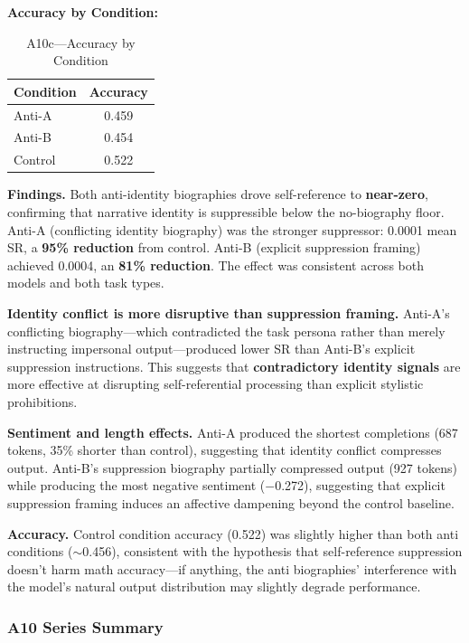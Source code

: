 \documentclass[11pt,a4paper]{article}
\begin{document}
\textbf{Accuracy by Condition:}

\begin{table}[H]
\centering
\caption{A10c---Accuracy by Condition}
\label{tab:a10c_acc}
\begin{tabular}{lc}
\toprule
\textbf{Condition} & \textbf{Accuracy} \\
\midrule
Anti-A & 0.459 \\
Anti-B & 0.454 \\
Control & 0.522 \\
\bottomrule
\end{tabular}
\end{table}

\textbf{Findings.} Both anti-identity biographies drove self-reference to \textbf{near-zero}, confirming that narrative identity is suppressible below the no-biography floor. Anti-A (conflicting identity biography) was the stronger suppressor: 0.0001 mean SR, a \textbf{95\% reduction} from control. Anti-B (explicit suppression framing) achieved 0.0004, an \textbf{81\% reduction}. The effect was consistent across both models and both task types.

\textbf{Identity conflict is more disruptive than suppression framing.} Anti-A's conflicting biography---which contradicted the task persona rather than merely instructing impersonal output---produced lower SR than Anti-B's explicit suppression instructions. This suggests that \textbf{contradictory identity signals} are more effective at disrupting self-referential processing than explicit stylistic prohibitions.

\textbf{Sentiment and length effects.} Anti-A produced the shortest completions (687 tokens, 35\% shorter than control), suggesting that identity conflict compresses output. Anti-B's suppression biography partially compressed output (927 tokens) while producing the most negative sentiment ($-$0.272), suggesting that explicit suppression framing induces an affective dampening beyond the control baseline.

\textbf{Accuracy.} Control condition accuracy (0.522) was slightly higher than both anti conditions ($\sim$0.456), consistent with the hypothesis that self-reference suppression doesn't harm math accuracy---if anything, the anti biographies' interference with the model's natural output distribution may slightly degrade performance.

\subsubsection{A10 Series Summary}
\end{document}
